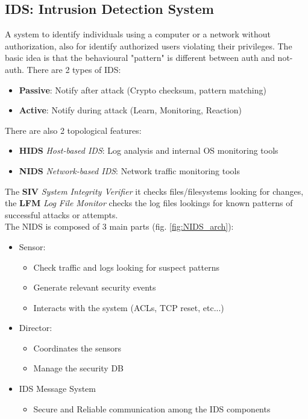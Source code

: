 \documentclass[12pt]{article}
\begin{document}
\subsection{IDS: Intrusion Detection System}
A system to identify individuals using a computer or a network without authorization, also for identify authorized users violating their privileges. The basic idea is that the behavioural "pattern" is different between auth and not-auth. There are 2 types of IDS:
\begin{itemize}
  \item \textbf{Passive}: Notify after attack (Crypto checksum, pattern matching)
  \item \textbf{Active}: Notify during attack (Learn, Monitoring, Reaction)
\end{itemize}
There are also 2 topological features:
\begin{itemize}
  \item \textbf{HIDS} \textit{Host-based IDS}: Log analysis and internal OS monitoring tools
  \item \textbf{NIDS} \textit{Network-based IDS}: Network traffic monitoring tools
\end{itemize}
The \textbf{SIV} \textit{System Integrity Verifier} it checks files/filesystems looking for changes, the \textbf{LFM} \textit{Log File Monitor} checks the log files lookings for known patterns of successful attacks or attempts.\\
The NIDS is composed of 3 main parts (fig. \ref{fig:NIDS_arch}):
\begin{itemize}
  \item Sensor:
  \begin{itemize}
    \item Check traffic and logs looking for suspect patterns
    \item Generate relevant security events
    \item Interacts with the system (ACLs, TCP reset, etc...)
  \end{itemize}
  \item Director:
  \begin{itemize}
    \item Coordinates the sensors
    \item Manage the security DB
  \end{itemize}
  \item IDS Message System
  \begin{itemize}
    \item Secure and Reliable communication among the IDS components
  \end{itemize}
\end{itemize}
\end{document}
